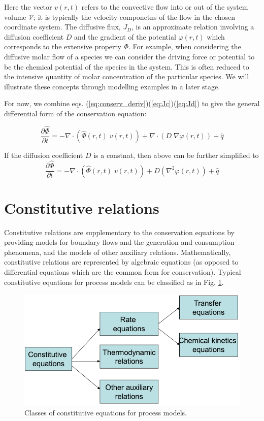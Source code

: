 \documentclass[a4paper,11pt]{article}
\theoremstyle{definition}
\begin{document}
\noindent Here the vector $v(r, t)$ refers to the convective flow into or out of the system volume $\mathcal{V}$;
it is typically the velocity componetns of the flow in the chosen coordinate system.
The diffusive flux, $J_D$, is an approximate relation involving a diffusion coefficient $D$ and the gradient of the 
potential $\varphi(r, t)$ which corresponds to the extensive property $\Phi$. For example, when considering the diffusive 
molar flow of a species we can consider the driving force or potential to be the chemical
potential of the species in the system. This is often reduced to the intensive quantity of
molar concentration of the particular species. We will illustrate these concepts through modelling examples
in a later stage.

For now, we combine eqs. (\ref{eq:conserv_deriv})(\ref{eq:Jc})(\ref{eq:Jd}) to give the general
differential form of the conservation equation:

\begin{equation} \label{eq:conserv_deriv_2}
	\frac{\partial \hat{\Phi}}{\partial t} = - \nabla \cdot \left( \hat{\Phi}(r, t) \; v(r, t) \right) 
		+ \nabla \cdot \left( D \; \nabla \varphi(r, t) \right)	 + \hat{q}
\end{equation}

\noindent If the diffusion coefficient $D$ is a constnat, then above can be further simplified to
\begin{equation} \label{eq:conserv_deriv_3}
	\frac{\partial \hat{\Phi}}{\partial t} = - \nabla \cdot \left( \hat{\Phi}(r, t) \; v(r, t) \right) 
		+  D \left( \nabla^2 \varphi(r, t) \right) + \hat{q}
\end{equation}


\section{Constitutive relations}

Constitutive relations are supplementary to the conservation equations by providing models
for boundary flows and the generation and consumption phenomena, and the models of other auxiliary relations.
Mathematically, constitutive relations are represented by algebraic equations 
(as opposed to differential equations which are the common form for conservation).
Typical constitutive equations for process models can be classified as in Fig. \ref{fig:class_const}.

\begin{figure} [!h]
 \begin{center}
	\includegraphics[width=.55\textwidth]{class_const}
 \end{center}
 \caption{Classes of constitutive equations for process models.} 
 \label{fig:class_const}
\end{figure}
\end{document}
